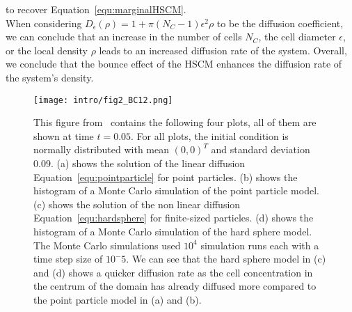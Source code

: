 to recover Equation~\eqref{equ:marginalHSCM}. \\ 
When considering \( D_\epsilon(\rho) = 1 + \pi(N_{C}-1)\epsilon^2 \rho \) to be the diffusion coefficient, we can conclude that an increase in the number of cells \( N_{C} \), the cell diameter \( \epsilon \), or the local density \( \rho \) leads to an increased diffusion rate of the system.
Overall, we conclude that the bounce effect of the HSCM enhances the diffusion rate of the system's density.

\begin{figure}[h!]
	\centering
    \texttt{[image: intro/fig2\_BC12.png]}
    \caption{
    This figure from~\cite{Bruna2012} contains the following four plots, all of them are shown at time \( t=0.05 \). 
	For all plots, the initial condition is normally distributed with mean $(0,0)^T$ and standard deviation $0.09$. 
    (a) shows the solution of the linear diffusion Equation~\eqref{equ:pointparticle} for point particles. 
    (b) shows the histogram of a Monte Carlo simulation of the point particle model. 
    (c) shows the solution of the non linear diffusion Equation~\eqref{equ:hardsphere} for finite-sized particles. 
    (d) shows the histogram of a Monte Carlo simulation of the hard sphere model. 
    The Monte Carlo simulations used $10^4$ simulation runs each with a time step size of $10^-5$.
	We can see that the hard sphere model in (c) and (d) shows a quicker diffusion rate as the cell concentration in the centrum of the domain has already diffused more compared to the point particle model in (a) and (b). 
    }
    \label{fig:fig2BC12}
\end{figure}

